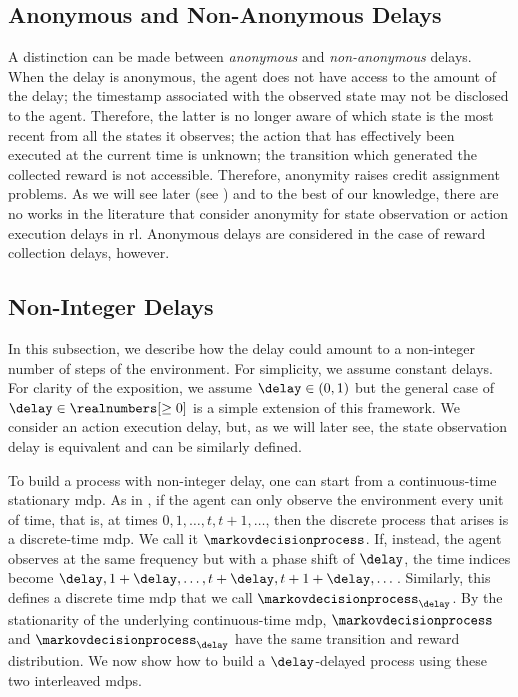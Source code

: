 \subsection{Anonymous and Non-Anonymous Delays}
\label{subsec:anonymous_delays}
A distinction can be made between \emph{anonymous} and \emph{non-anonymous} delays. 
When the delay is anonymous, the agent does not have access to the amount of the delay; the timestamp associated with the observed state may not be disclosed to the agent.
Therefore, the latter is no longer aware of which state is the most recent from all the states it observes; the action that has effectively been executed at the current time is unknown; the transition which generated the collected reward is not accessible. 
Therefore, anonymity raises credit assignment problems.
As we will see later (see ) and to the best of our knowledge, there are no works in the literature that consider anonymity for state observation or action execution delays in \gls{rl}. 
Anonymous delays are considered in the case of reward collection delays, however.


\subsection{Non-Integer Delays}
\label{subsec:non_int_delays}
In this subsection, we describe how the delay could amount to a non-integer number of steps of the environment.
For simplicity, we assume constant delays.
For clarity of the exposition, we assume $\delay\in(0,1)$ but the general case of $\delay\in\realnumbers[\ge0]$ is a simple extension of this framework.
We consider an action execution delay, but, as we will later see, the state observation delay is equivalent and can be similarly defined. 

To build a process with non-integer delay, one can start from a continuous-time stationary \gls{mdp}. 
As in \cite{sutton1999between}, if the agent can only observe the environment every unit of time, that is, at times $0,1,\dots,t,t+1,\dots$, then the discrete process that arises is a discrete-time \gls{mdp}. 
We call it $\markovdecisionprocess$. 
If, instead, the agent observes at the same frequency but with a phase shift of $\delay$, the time indices become $\delay,1+\delay,\dots,t+\delay,t+1+\delay,\dots$. 
Similarly, this defines a discrete time \gls{mdp} that we call $\markovdecisionprocess_\delay$. 
By the stationarity of the underlying continuous-time \gls{mdp}, $\markovdecisionprocess$ and $\markovdecisionprocess_\delay$ have the same transition and reward distribution. 
We now show how to build a $\delay$-delayed process using these two interleaved \glspl{mdp}.

